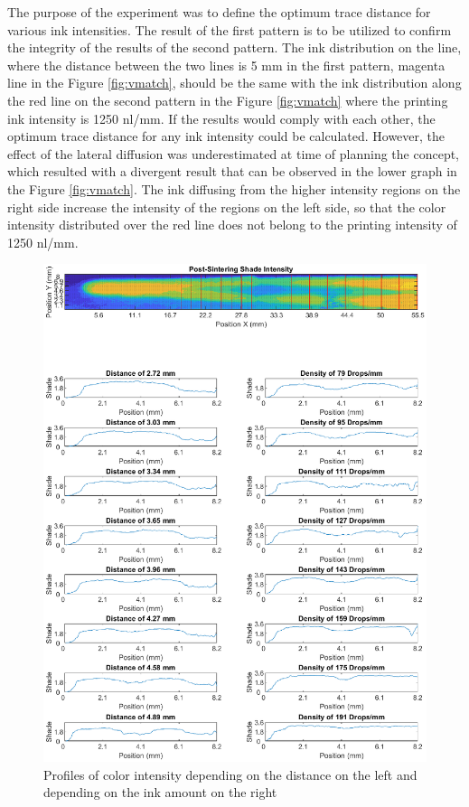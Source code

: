 \bigskip

The purpose of the experiment was to define the optimum trace distance for various ink intensities. The result of the first pattern is to be utilized to confirm the integrity of the results of the second pattern. The ink distribution on the line, where the distance between the two lines is 5 mm in the first pattern, magenta line in the Figure \ref{fig:vmatch}, should be the same with the ink distribution along the red line on the second pattern in the Figure \ref{fig:vmatch} where the printing ink intensity is 1250 nl/mm. If the results would comply with each other, the optimum trace distance for any ink intensity could be calculated. However, the effect of the lateral diffusion was underestimated at time of planning the concept, which resulted with a divergent result that can be observed in the lower graph in the Figure	\ref{fig:vmatch}. The ink diffusing from the higher intensity regions on the right side increase the intensity of the regions on the left side, so that the color intensity distributed over the red line does not belong to the printing intensity of 1250 nl/mm.

\bigskip

\begin{figure}[H]
	\centering
	\includegraphics[width=1\textwidth]{grafiken/vProfile.eps}
	\caption{Profiles of color intensity depending on the distance on the left and depending on the ink amount on the right}
	\label{fig:vProfile}
\end{figure} 

